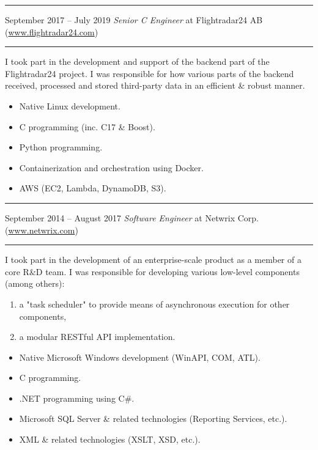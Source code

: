\documentclass[11pt]{article}
\newcommand\CXX{C\nolinebreak[4]\hspace{-.05em}\raisebox{.4ex}{\relsize{-3}{\textbf{++}}}}
\newcommand\CvSmallSkipLength{0.5em}
\newcommand\CvSkip[1]{\vspace{#1}}
\newcommand\CvSmallSkip{\CvSkip{\CvSmallSkipLength}}
\newcommand\CvRule{\begingroup\color{CvRuleColor}\hrule\endgroup}
\newcommand\CvWorkplaceHeader[5]{\begingroup%
  \CvRule\nopagebreak%
  \fboxsep0pt%
  \colorbox{CvWorkplaceHeaderColor}{%
    \begin{minipage}{\linewidth-2\fboxsep}%
\CvSmallSkip%
#1 -- #2 \hfill \textit{#3} at #4 (\href{http://#5/}{#5})%
\CvSmallSkip%
    \end{minipage}%
  }%
  \CvRule%
\endgroup%
}
\newenvironment{CvWorkplaceDescription}{%
    \begingroup\setlength\parskip{\CvSmallSkipLength}%
  }{%
    \CvSmallSkip\endgroup%
  }
\begin{document}
\CvWorkplaceHeader{September 2017}{July 2019}{Senior {\CXX} Engineer}{Flightradar24 AB}{www.flightradar24.com}

\begin{CvWorkplaceDescription}
I took part in the development and support of the backend part of the
Flightradar24 project.
I was responsible for how various parts of the backend received, processed and
stored third-party data in an efficient \& robust manner.

\begin{itemize}[noitemsep]
  \item Native Linux development.
  \item {\CXX} programming (inc. {\CXX}17 \& Boost).
  \item Python programming.
  \item Containerization and orchestration using Docker.
  \item AWS (EC2, Lambda, DynamoDB, S3).
\end{itemize}
\end{CvWorkplaceDescription}

\CvWorkplaceHeader{September 2014}{August 2017}{Software Engineer}{Netwrix Corp.}{www.netwrix.com}

\begin{CvWorkplaceDescription}
I took part in the development of an enterprise-scale product as a member of a
core R\&D team.
I was responsible for developing various low-level components (among others):
\begin{enumerate}[noitemsep]
  \item a "task scheduler" to provide means of asynchronous execution for
other components,
  \item a modular RESTful API implementation.
\end{enumerate}

\begin{itemize}[noitemsep]
  \item Native Microsoft Windows development (WinAPI, COM, ATL).
  \item {\CXX} programming.
  \item .NET programming using C\#.
  \item Microsoft SQL Server \& related technologies (Reporting Services,
etc.).
  \item XML \& related technologies (XSLT, XSD, etc.).
\end{itemize}
\end{CvWorkplaceDescription}
\end{document}
